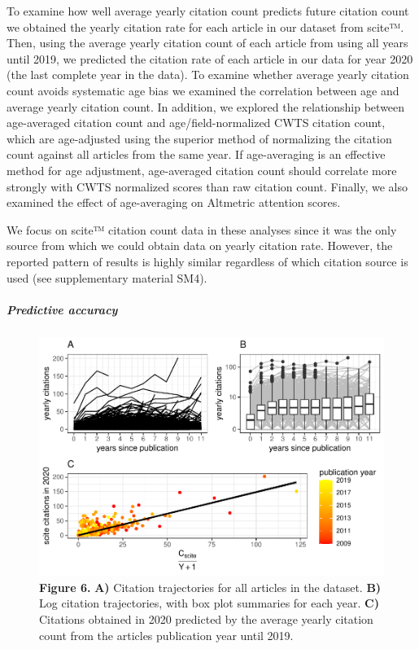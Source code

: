\documentclass[
  english,
  man,floatsintext]{apa6}
\let\oldsubparagraph\subparagraph
\renewcommand{\subparagraph}[1]{\oldsubparagraph{#1}\mbox{}}
\begin{document}
To examine how well average yearly citation count predicts future citation count we obtained the yearly citation rate for each article in our dataset from scite™. Then, using the average yearly citation count of each article from using all years until 2019, we predicted the citation rate of each article in our data for year 2020 (the last complete year in the data). To examine whether average yearly citation count avoids systematic age bias we examined the correlation between age and average yearly citation count. In addition, we explored the relationship between age-averaged citation count and age/field-normalized CWTS citation count, which are age-adjusted using the superior method of normalizing the citation count against all articles from the same year. If age-averaging is an effective method for age adjustment, age-averaged citation count should correlate more strongly with CWTS normalized scores than raw citation count. Finally, we also examined the effect of age-averaging on Altmetric attention scores.

We focus on scite™ citation count data in these analyses since it was the only source from which we could obtain data on yearly citation rate. However, the reported pattern of results is highly similar regardless of which citation source is used (see supplementary material SM4).

\hypertarget{predictive-accuracy}{%
\subparagraph{Predictive accuracy}\label{predictive-accuracy}}

\begin{figure}
\centering
\includegraphics{RVcn_feasibility_in_social_neuroscience_files/figure-latex/fig6-1.pdf}
\caption{\label{fig:fig6}\textbf{Figure 6.} \textbf{A)} Citation trajectories for all articles in the dataset. \textbf{B)} Log citation trajectories, with box plot summaries for each year. \textbf{C)} Citations obtained in 2020 predicted by the average yearly citation count from the articles publication year until 2019.}
\end{figure}
\end{document}
